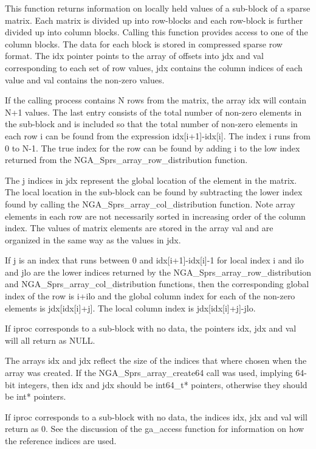 \documentclass[12pt]{article}
\begin{document}
\begin{desc}
This function returns information on locally held values of a sub-block of a
sparse matrix. Each matrix is divided up into row-blocks and each row-block is
further divided up into column blocks. Calling this function provides access to
one of the column blocks. The data for each block is stored in compressed sparse
row format. The idx pointer points to the array of offsets into jdx and val
corresponding to each set of row values, jdx contains the column indices of
each value and val contains the non-zero values.

If the calling process contains N rows from the matrix, the array idx will
contain N+1 values. The last entry consists of the total number of non-zero
elements in the sub-block and is included so that the total number of non-zero
elements in each row i can be found from the expression idx[i+1]-idx[i]. The
index i runs from 0 to N-1. The true index for the row can be found by adding
i to the low index returned from the NGA_Sprs_array_row_distribution function.

The j indices in jdx represent the global location of the element in the matrix.
The local location in the sub-block can be found by subtracting the lower index
found by calling the NGA_Sprs_array_col_distribution function. Note array
elements in each row are not necessarily sorted in increasing order of the
column index. The values of matrix elements are stored in the array val and
are organized in the same way as the values in jdx.

If j is an index that runs between 0 and idx[i+1]-idx[i]-1 for local index i
and ilo and jlo are the lower indices returned by the
NGA_Sprs_array_row_distribution and NGA_Sprs_array_col_distribution functions,
then the corresponding global index of the row is i+ilo and the global column
index for each of the non-zero elements is jdx[idx[i]+j]. The local column
index is jdx[idx[i]+j]-jlo.
\end{desc}

\begin{cdesc}
If iproc  corresponds to a sub-block with no data, the pointers idx, jdx and val
will all return as NULL.

The arrays idx and jdx reflect the size of the indices that where chosen when
the array was created. If the NGA_Sprs_array_create64 call was used, implying
64-bit integers, then idx and jdx should be int64_t* pointers, otherwise they
should be int* pointers.
\end{cdesc}
\begin{fdesc}
If iproc corresponds to a sub-block with no data, the indices idx, jdx and val
will return as 0. See the discussion of the ga_access function for information
on how the reference indices are used.
\end{fdesc}
\end{document}
